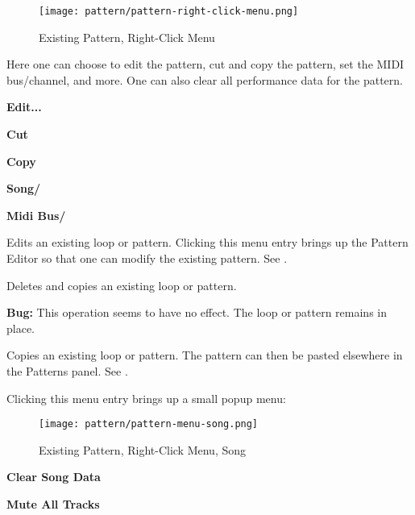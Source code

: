 \begin{figure}[H]
   \centering 
   \texttt{[image: pattern/pattern-right-click-menu.png]}
   \caption{Existing Pattern, Right-Click Menu}
   \label{fig:pattern_window_right_click}
\end{figure}

   Here one can choose to edit the pattern, cut and copy the pattern,
   set the MIDI bus/channel, and more.
   One can also clear all performance data for the pattern.
   
   \begin{enumber}
      \item \textbf{Edit...}
      \item \textbf{Cut}
      \item \textbf{Copy}
      \item \textbf{Song/}
      \item \textbf{Midi Bus/}
   \end{enumber}

   \setcounter{ItemCounter}{0}      %

   Edits an existing loop or pattern.
   Clicking this menu entry brings up the Pattern Editor
   so that one can modify the existing pattern.
   See .

   Deletes and copies an existing loop or pattern.

   \textbf{Bug:}
   This operation seems to have no effect.  The loop or pattern remains in
   place.

   Copies an existing loop or pattern.
   The pattern can then be pasted elsewhere in the Patterns panel.
   See .

   Clicking this menu entry brings up a small popup menu:

\begin{figure}[H]
   \centering 
   \texttt{[image: pattern/pattern-menu-song.png]}
   \caption{Existing Pattern, Right-Click Menu, Song}
   \label{fig:pattern_window_right_click_song}
\end{figure}

   \begin{enumber}
      \item \textbf{Clear Song Data}
      \item \textbf{Mute All Tracks}
   \end{enumber}

